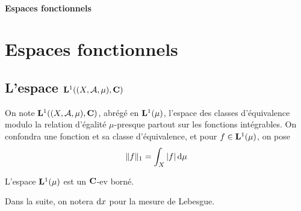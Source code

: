 \ifsolo
    ~

    \vspace{1cm}

    \begin{center}
        \textbf{\LARGE Espaces fonctionnels} \\[1em]
    \end{center}
    \tableofcontents
\else
    \chapter{Espaces fonctionnels}

    \minitoc
\fi
\thispagestyle{empty}

\section{L'espace \texorpdfstring{$\mathbf L^1((X, \mathcal  A, \mu), \mathbf C)$ }{L1((X, A, mu), C)}}

\begin{dfn}
    On note $\mathbf L^1((X, \mathcal  A, \mu), \mathbf C)$, abrégé en $\mathbf L^1(\mu)$, l'espace des classes d'équivalence modulo la relation d'égalité  $\mu$-presque partout sur les fonctions intégrables. On confondra une fonction et sa classe d'équivalence, et pour  $f \in \mathbf L^1(\mu)$, on pose \[
    \|f\|_1=\int_X|f|\mathop{}\!\mathrm d\mu
    \] 
\end{dfn}

\begin{rem}
    L'espace $\mathbf L^1(\mu)$ est un  $ \mathbf C$-ev borné.
\end{rem}


\begin{rem}
Dans la suite, on notera $\mathop{}\!\mathrm d x$ pour la mesure de Lebesgue.
\end{rem}

